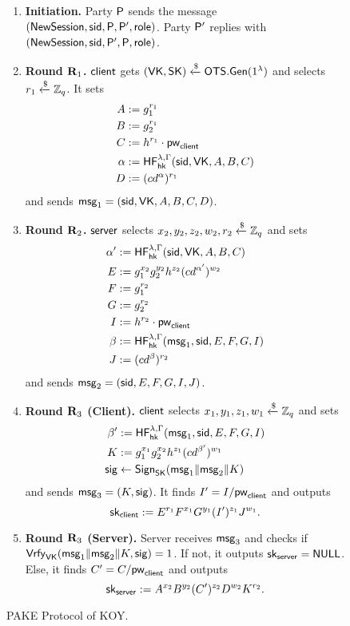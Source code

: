 \begin{figure}[tbp]
\begin{framed}
		\begin{enumerate}
			\item \textbf{Initiation.} Party $\mathsf{P}$ sends the message $(\mathsf{NewSession},\mathsf{sid},\mathsf{P},\mathsf{P}',\mathsf{role})$. Party $\mathsf{P}'$ replies with $(\mathsf{NewSession},\mathsf{sid},\mathsf{P}',\mathsf{P},\mathsf{role})$.
			\item \textbf{Round $\mathbf{R}_1$.} $\mathsf{client}$ gets $(\mathsf{VK},\mathsf{SK})\xleftarrow{\$}\mathsf{OTS}.\mathsf{Gen}(1^\lambda)$ and selects $r_1\xleftarrow{\$}\mathbb{Z}_q$. It sets
			\begin{align*}
				A &:= g_1^{r_1} \\B &:= g_2^{r_1}\\ C &:= h^{r_1}\cdot\mathsf{pw}_{\mathsf{client}}  \\ \alpha &:= \mathsf{HF}_{\mathsf{hk}}^{\lambda,\Gamma}(\mathsf{sid},\mathsf{VK},A,B,C) \\ D &:= (cd^{\alpha})^{r_1}
			\end{align*}
			and sends $\mathsf{msg}_{1} = (\mathsf{sid},\mathsf{VK},A,B,C,D)$.
			\item \textbf{Round $\mathbf{R}_2$.} $\mathsf{server}$ selects $x_2,y_2,z_2,w_2,r_2\xleftarrow{\$}\mathbb{Z}_q$ and sets
			\begin{align*}
				\alpha' &:= \mathsf{HF}_{\mathsf{hk}}^{\lambda,\Gamma}(\mathsf{sid},\mathsf{VK},A,B,C)\\
				E &:= g_1^{x_2}g_2^{y_2}h^{z_2}(cd^{\alpha'})^{w_2}\\
				F &:= g_1^{r_2}\\
				G &:= g_2^{r_2}\\
				I &:= h^{r_2}\cdot\mathsf{pw}_{\mathsf{client}}\\
				\beta &:= \mathsf{HF}_{\mathsf{hk}}^{\lambda,\Gamma}(\mathsf{msg}_{1},\mathsf{sid},E,F,G,I)\\
				J &:= (cd^{\beta})^{r_2}
			\end{align*}
			and sends $\mathsf{msg}_{2}=(\mathsf{sid},E,F,G,I,J)$.
			\item \textbf{Round $\mathbf{R}_3$ (Client).} $\mathsf{client}$ selects $x_1,y_1,z_1,w_1\xleftarrow{\$}\mathbb{Z}_q$ and sets
			\begin{align*}
			 \beta' &:= \mathsf{HF}_{\mathsf{hk}}^{\lambda,\Gamma}(\mathsf{msg}_{1},\mathsf{sid},E,F,G,I)\\
			 K &:= g_1^{x_1}g_2^{x_2}h^{z_1}(cd^{\beta'})^{w_1}\\
			 \mathsf{sig} &\gets\mathsf{Sign}_{\mathsf{SK}}(\mathsf{msg}_{1}\|\mathsf{msg}_{2}\|K)
			\end{align*}
			and sends $\mathsf{msg}_{3} = (K,\mathsf{sig})$. It finds $I' = I/\mathsf{pw}_{\mathsf{client}}$ and outputs $$\mathsf{sk}_{\mathsf{client}} := E^{r_1}F^{x_1}G^{y_1}(I')^{z_1}J^{w_1}.$$
			\item \textbf{Round $\mathbf{R}_3$ (Server).} Server receives $\mathsf{msg}_{3}$ and checks if $\mathsf{Vrfy}_{\mathsf{VK}}(\mathsf{msg}_{1}\|\mathsf{msg}_{2}\|K,\mathsf{sig})=1$. If not, it outputs $\mathsf{sk}_{\mathsf{server}}=\mathsf{NULL}$. Else, it finds $C'=C/\mathsf{pw}_{\mathsf{client}}$ and outputs 
			$$\mathsf{sk}_{\mathsf{server}} := A^{x_2}B^{y_2}(C')^{z_2}D^{w_2}K^{r_2}.$$
		\end{enumerate}
		
	\end{framed}
	\caption{PAKE Protocol of KOY.}
	\label{fig:koy}
\end{figure}


